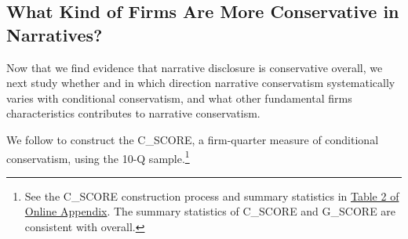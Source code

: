 \documentclass[letterpaper,11pt]{article}
\begin{document}
\begin{spacing}{1.5}
\subsection{What Kind of Firms Are More Conservative in Narratives?}
Now that we find evidence that narrative disclosure is conservative overall, we next study whether and in which direction narrative conservatism systematically varies with conditional conservatism, and what other fundamental firms characteristics contributes to narrative conservatism.  

We follow  to construct the C\_SCORE, a firm-quarter measure of conditional conservatism, using the 10-Q sample.\footnote{See the C\_SCORE construction process and summary statistics in \hyperref[oat2]{Table 2 of Online Appendix}. The summary statistics of C\_SCORE and G\_SCORE are consistent with  overall. }
\begin{comment}
	Specifically, we run the following cross-sectional model for each fiscal year from 1993 to 2015:
	\begin{equation} \label{eq3}
	\begin{split}
	EARN_{i,t} = \beta_0&+\beta_1NEG_{i,t}+\beta_2RET_{i,t}\\
	&+\beta_3RET_{i,t}\times SIZE_{i,t}+\beta_4RET_{i,t}\times MTB_{i,t}+\beta_5RET_{i,t}\times LEV_{i,t}+\beta_6RET_{i,t}\times NEG_{i,t}\\
	&+\beta_7RET_{i,t}\times NEG_{i,t}\times SIZE_{i,t}+\beta_8RET_{i,t}\times NEG_{i,t}\times MTB_{i,t}+\beta_9RET_{i,t}\times NEG_{i,t}\times LEV_{i,t}\\
	&+\beta_{10}SIZE_{i,t}+\beta_{11}MTB_{i,t}+\beta_{12}LEV_{i,t}\\
	&+\beta_{13}NEG_{i,t}\times SIZE_{i,t}+\beta_{14}NEG_{i,t}\times MTB_{i,t}+\beta_{15}NEG_{i,t}\times LEV_{i,t}+ \epsilon_{i,t}
	\end{split}
	\end{equation}
	We obtain the estimates from Equation 3 and use them to calculate C\_SCORE and G\_SCORE following Equation 4 and Equation 5 respectively. C\_SCORE captures the incremental timeliness of bad news and measures conditional conservatism, with more positive value being more conditionally conservative. G\_SCORE captures the timeliness of good news.
	\begin{equation}\label{eq4}
	C\_SCORE_{i,t} = \beta_6+\beta_7SIZE_{i,t}+\beta_8MTB_{i,t}+\beta_9LEV_{i,t}
	\end{equation}
	\begin{equation}\label{eq5}
	G\_SCORE_{i,t} = \beta_2+\beta_3SIZE_{i,t}+\beta_4MTB_{i,t}+\beta_5LEV_{i,t}
	\end{equation}
	

\end{comment}
\end{spacing}
\end{document}

